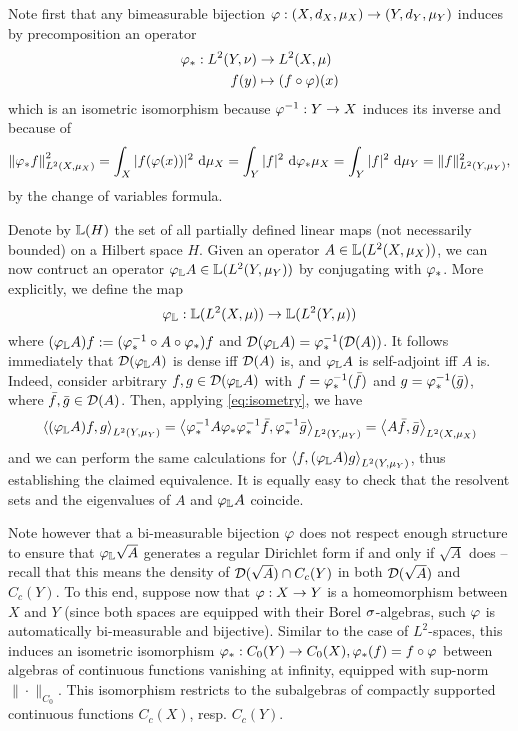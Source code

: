 Note first that any bimeasurable bijection $\varphi:(X,d_X,\mu_X)\to(Y,d_Y,\mu_Y)$ induces by precomposition an operator
\begin{align*}
  \varphi_*:L^2(Y,\nu)&\to L^2(X,\mu)\\
  f(y)&\mapsto(f\circ\varphi)(x)
\end{align*}
which is an isometric isomorphism because $\varphi^{-1}:Y\to X$ induces its inverse and because of
\begin{equation}\label{eq:isometry}
  \left\|\varphi_*f\right\|_{L^2(X,\mu_X)}^2
  =\int_X |f(\varphi(x))|^2\,\operatorname{d}\!\mu_X
  =\int_Y |f|^2\,\operatorname{d}\!\varphi_*\mu_X
  =\int_Y |f|^2\,\operatorname{d}\!\mu_Y
  =\|f\|_{L^2(Y,\mu_Y)}^2,
\end{equation}
by the change of variables formula. 

Denote by $\mathbb{L}(H)$ the set of all partially defined linear maps (not necessarily bounded) on a Hilbert space $H$. Given an operator $A\in\mathbb{L}(L^2(X,\mu_X))$, we can now contruct an operator $\varphi_{\mathbb{L}} A\in\mathbb{L}(L^2(Y,\mu_Y))$ by conjugating with $\varphi_*$. More explicitly, we define the map
\[
  \varphi_{\mathbb{L}}:\mathbb{L}(L^2(X,\mu))\to\mathbb{L}(L^2(Y,\mu))
\]
where $(\varphi_{\mathbb{L}} A)f:=(\varphi_*^{-1}\circ A\circ\varphi_*)f$ and $\mathcal{D}(\varphi_{\mathbb{L}} A)=\varphi_*^{-1}(\mathcal{D}(A))$. It follows immediately that $\mathcal{D}(\varphi_{\mathbb{L}} A)$ is dense iff $\mathcal{D}(A)$ is, and $\varphi_{\mathbb{L}} A$ is self-adjoint iff $A$ is. Indeed, consider arbitrary $f,g\in\mathcal{D}(\varphi_{\mathbb{L}} A)$ with $f=\varphi_*^{-1}(\bar f)$ and $g=\varphi_*^{-1}(\bar g)$, where $\bar f, \bar g\in \mathcal{D}(A)$. Then, applying \eqref{eq:isometry}, we have
\[
  \left<(\varphi_{\mathbb{L}} A)f,g\right>_{L^2(Y,\mu_Y)}
  =\left<\varphi_*^{-1}A\varphi_*\varphi_*^{-1}\bar f,\varphi_*^{-1}\bar g\right>_{L^2(Y,\mu_Y)}
  =\left<A\bar f,\bar g\right>_{L^2(X,\mu_X)}
\]
and we can perform the same calculations for $\left<f,(\varphi_{\mathbb{L}} A)g\right>_{L^2(Y,\mu_Y)}$, thus establishing the claimed equivalence. It is equally easy to check that the resolvent sets and the eigenvalues of $A$ and $\varphi_{\mathbb{L}} A$ coincide.

Note however that a bi-measurable bijection $\varphi$ does not respect enough structure to ensure that 
$\varphi_{\mathbb{L}} \sqrt{A}$ generates a regular Dirichlet form if and only if $\sqrt{A}$ does -- recall that this means the density of $\mathcal{D}(\sqrt{A})\cap C_c(Y)$ in both $\mathcal{D}(\sqrt{A})$ and $C_c(Y)$. To this end, suppose now that $\varphi:X\to Y$ is a homeomorphism between $X$ and $Y$ (since both spaces are equipped with their Borel $\sigma$-algebras, such $\varphi$ is automatically bi-measurable and bijective). Similar to the case of $L^2$-spaces, this induces an isometric isomorphism $\varphi_*:C_0(Y)\to C_0(X), \varphi_*(f)=f\circ\varphi$ between algebras of continuous functions vanishing at infinity, equipped with sup-norm $\|\cdot\|_{C_0}$. This isomorphism restricts to the subalgebras of compactly supported continuous functions $C_c(X)$, resp. $C_c(Y)$. 




